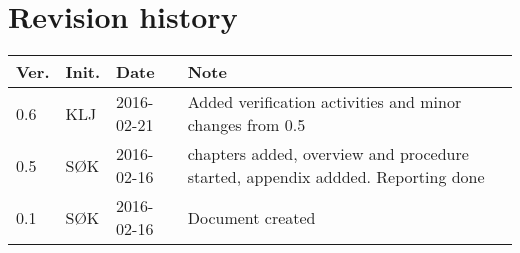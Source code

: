 \chapter*{Revision history}
\label{app:rev_his}


\begin{tabular}{b{1cm} b{1cm} b{2cm} b{8cm}}
    \textbf{Ver.} & \textbf{Init.} & \textbf{Date} & \textbf{Note} \\
    \hline
    0.6 & KLJ & 2016-02-21 & Added verification activities and minor changes from 0.5 \\
    0.5 & SØK & 2016-02-16 & chapters added, overview and procedure started, appendix addded. Reporting done \\
    0.1 & SØK & 2016-02-16 & Document created \\
\end{tabular}
